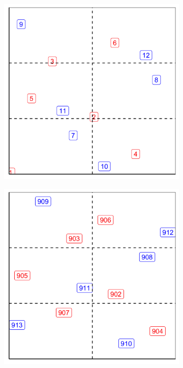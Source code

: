 \documentclass[a4paper,11pt]{article} %
\begin{document}
\begin{figure}[htbp]
\centering
  \begin{subfigure}[b]{0.45\textwidth}
    \includegraphics[width=\textwidth]{p1.png}
    \caption{}
  \end{subfigure}
  \begin{subfigure}[b]{0.45\textwidth}
    \includegraphics[width=\textwidth]{p2.png}

\end{subfigure}
\end{figure}
\end{document}
